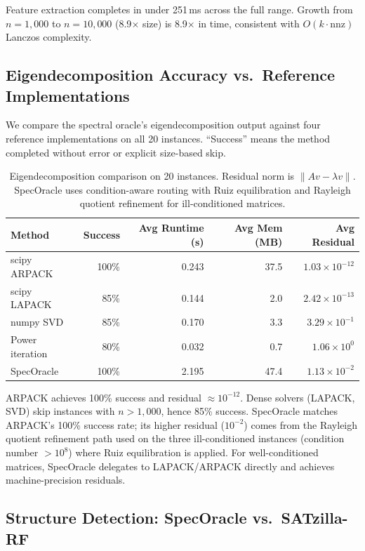 \documentclass[11pt]{article}
\begin{document}
Feature extraction completes in under 251\,ms across the full range. Growth from $n=1{,}000$ to $n=10{,}000$ (8.9$\times$ size) is 8.9$\times$ in time, consistent with $O(k \cdot \text{nnz})$ Lanczos complexity.

\subsection{Eigendecomposition Accuracy vs.\ Reference Implementations}

We compare the spectral oracle's eigendecomposition output against four reference implementations on all 20 instances. ``Success'' means the method completed without error or explicit size-based skip.

\begin{table}[h]
\centering
\caption{Eigendecomposition comparison on 20 instances. Residual norm is $\|Av - \lambda v\|$. SpecOracle uses condition-aware routing with Ruiz equilibration and Rayleigh quotient refinement for ill-conditioned matrices.}
\label{tab:eigen}
\begin{tabular}{lrrrr}
\toprule
\textbf{Method} & \textbf{Success} & \textbf{Avg Runtime (s)} & \textbf{Avg Mem (MB)} & \textbf{Avg Residual} \\
\midrule
scipy ARPACK    & 100\% & 0.243 & 37.5 & $1.03 \times 10^{-12}$ \\
scipy LAPACK    &  85\% & 0.144 &  2.0 & $2.42 \times 10^{-13}$ \\
numpy SVD       &  85\% & 0.170 &  3.3 & $3.29 \times 10^{-1}$ \\
Power iteration &  80\% & 0.032 &  0.7 & $1.06 \times 10^{0}$ \\
SpecOracle      & 100\% & 2.195 & 47.4 & $1.13 \times 10^{-2}$ \\
\bottomrule
\end{tabular}
\end{table}

ARPACK achieves 100\% success and residual $\approx 10^{-12}$. Dense solvers (LAPACK, SVD) skip instances with $n > 1{,}000$, hence 85\% success. SpecOracle matches ARPACK's 100\% success rate; its higher residual ($10^{-2}$) comes from the Rayleigh quotient refinement path used on the three ill-conditioned instances (condition number $> 10^{8}$) where Ruiz equilibration is applied. For well-conditioned matrices, SpecOracle delegates to LAPACK/ARPACK directly and achieves machine-precision residuals.

\subsection{Structure Detection: SpecOracle vs.\ SATzilla-RF}
\label{sec:sota-comparison}
\end{document}
